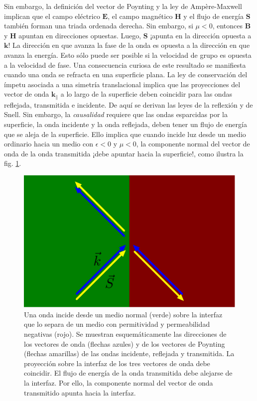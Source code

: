 \documentclass[12pt]{article}
\begin{document}
Sin embargo, la definición del vector de Poynting y la ley de
Ampère-Maxwell implican que el campo eléctrico $\bm E$, el campo
magnético $\bm H$ y el flujo de energía $\bm S$ también forman una
triada ordenada derecha. Sin embargo, si $\mu<0$, entonces $\bm B$ y
$\bm H$ apuntan en direcciones opuestas. Luego, $\bm S$ ¡apunta en la
dirección opuesta a $\bm k$! La dirección en que avanza la fase de la
onda es opuesta a la dirección en que avanza la energía. Esto sólo
puede ser posible si la velocidad de grupo es opuesta a la velocidad
de fase. Una consecuencia curiosa de este resultado se manifiesta
cuando una onda se refracta en una superficie plana. La ley de
conservación del ímpetu asociada a una simetría translacional implica
que las proyecciones del vector de onda $\bm k_\|$ a lo largo de la
superficie deben coincidir para las ondas reflejada,  transmitida e
incidente. De aquí se derivan las leyes de la reflexión y de
Snell. Sin embargo, la {\em causalidad} requiere que las ondas
esparcidas por la superficie, la onda incidente y la onda reflejada,
deben tener un flujo de energía que se aleja de la superficie. Ello
implica que cuando incide luz desde un medio ordinario hacia un medio
con $\epsilon<0$ y $\mu<0$, la componente normal del vector de onda de
la onda transmitida ¡debe apuntar hacia la superficie!, como ilustra
la fig. \ref{fig:refneg}.
\begin{figure}
  \centering
  \includegraphics{fig9}
  \caption{Una onda incide desde un medio normal (verde) sobre la
    interfaz que lo separa de un medio con permitividad y
    permeabilidad negativas (rojo). Se muestran esquemáticamente las
    direcciones de los vectores de onda (flechas azules) y de los
    vectores de Poynting (flechas amarillas) de las ondas incidente,
    reflejada y transmitida. La proyección sobre la interfaz de los
    tres vectores de onda debe coincidir. El flujo de energía de la
    onda transmitida debe alejarse de la interfaz. Por ello, la
    componente normal del vector de onda transmitido apunta hacia la
    interfaz.}
  \label{fig:refneg}
\end{figure}
\end{document}
